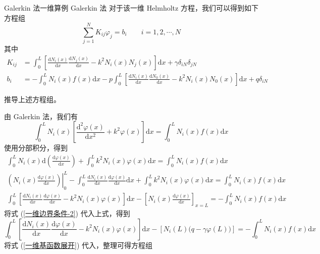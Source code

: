 \begin{theorem}{Galerkin 法}{一维算例 Galerkin 法}
    对于该一维 Helmholtz 方程，我们可以得到如下方程组
    \begin{equation}
        \sum_{j=1}^{N} K_{ij} \varphi_j = b_i \qquad i = 1, 2, \cdots, N
    \end{equation}
    其中
    \begin{align}
        K_{ij} &= 
        \int_{0}^{L}\left[
            \frac{\text{d}N_i(x)}{\text{d}x}\frac{\text{d}N_j(x)}{\text{d}x}
            - k^2N_i(x)N_j(x)
        \right]\text{d}x+\gamma\delta_{iN}\delta_{jN}\\
        b_i &= 
        -\int_{0}^{L}N_i(x)f(x)\text{d}x
        -p\int_{0}^{L}\left[
            \frac{\text{d}N_i(x)}{\text{d}x}\frac{\text{d}N_0(x)}{\text{d}x}
            - k^2N_i(x)N_0(x)
        \right]\text{d}x+q\delta_{iN}
    \end{align}
\end{theorem}

\begin{exercise}
    推导上述方程组。
\end{exercise}

\begin{solution}
    由 Galerkin 法，我们有
    \begin{equation*}
        \int_{0}^{L}N_i(x)\left[
            \frac{\text{d}^2\varphi(x)}{\text{d}x^2}+k^2\varphi(x)
        \right]\text{d}x = 
        \int_{0}^{L}N_i(x)f(x)\text{d}x
    \end{equation*}
    使用分部积分，得到
    \begin{gather*}
        \int_{0}^{L}N_i(x)
        \text{d}\left(\frac{\text{d}\varphi(x)}{\text{d}x}\right) 
        +\int_{0}^{L}
            k^2N_i(x)\varphi(x)
        \text{d}x = 
        \int_{0}^{L}N_i(x)f(x)\text{d}x\\
        \left.\left(
            N_i(x)\frac{\text{d}\varphi(x)}{\text{d}x}
        \right)\right|_0^L
        -\int_{0}^{L}
        \frac{\text{d}N_i(x)}{\text{d}x}
        \frac{\text{d}\varphi(x)}{\text{d}x}
        \text{d}x
        +\int_{0}^{L}
            k^2N_i(x)\varphi(x)
        \text{d}x = 
        \int_{0}^{L}N_i(x)f(x)\text{d}x\\
        \int_{0}^{L}\left[
            \frac{\text{d}N_i(x)}{\text{d}x}\frac{\text{d}\varphi(x)}{\text{d}x}
            - k^2N_i(x)\varphi(x)
        \right]\text{d}x
        -\left[N_i(x)\frac{\text{d}\varphi(x)}{\text{d}x}\right]_{x=L} = 
        -\int_{0}^{L}N_i(x)f(x)\text{d}x
    \end{gather*}
    将式 (\ref{一维边界条件-2}) 代入上式，得到
    \begin{equation*}
        \int_{0}^{L}\left[
            \frac{\text{d}N_i(x)}{\text{d}x}\frac{\text{d}\varphi(x)}{\text{d}x}
            - k^2N_i(x)\varphi(x)
        \right]\text{d}x
        -\left[N_i(L)\Big(q-\gamma\varphi(L)\Big)\right]= 
        -\int_{0}^{L}N_i(x)f(x)\text{d}x
    \end{equation*}
    将式 (\ref{一维基函数展开}) 代入，整理可得方程组
\end{solution}

